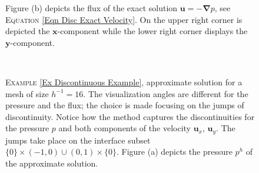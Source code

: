 \documentclass[3p]{elsarticle}
\def\u{\mathbf u}
\def\grad{\bm{\nabla}}
\begin{document}
\begin{example}
\begin{figure}[t]
{	Figure (b) depicts the flux of the exact solution 
	$ \u = - \grad p 
	$, see \textsc{Equation} \eqref{Eqn Disc Exact Velocity}. On the upper right corner is depicted the $\boldsymbol{x}$-component while the lower right corner displays the $\boldsymbol{y}$-component. \label{Fig Disc Exact Solution Numerical Example} }
\end{figure}
%
%
%
%
\begin{figure}[h] %
	\centering
	\begin{subfigure}
	[Pressure Approximate Solution. ]
		{\resizebox{7.8cm}{8.0cm}
			{\texttt{[image: Discont\_Approx\_Pressure.pdf]} } 
			}
	\end{subfigure} %
	~ %
	\begin{subfigure}[Flux Approximate Solution.]
		{\resizebox{7.8cm}{8.0cm}
			{\texttt{[image: Discont\_Approx\_Velocity.pdf]} }
			 }                
	\end{subfigure} %
	\caption{\textsc{Example} \ref{Ex Discontinuous Example}, approximate solution for a mesh of size $ h^{-1} = 16 $. The visualization angles are different for the pressure and the flux; the choice is made focusing on the jumps of discontinuity. Notice how the method captures the discontinuities for the pressure $ p $ and both components of the velocity $ \u_{x} $, $ \u_{y} $. The jumps take place on the interface subset $\{0\}\times (-1,0) \cup (0,1)\times \{0\} $.  Figure (a) depicts the pressure $p^{h}$ of the approximate solution.
}
\end{figure}
\end{example}
\end{document}
